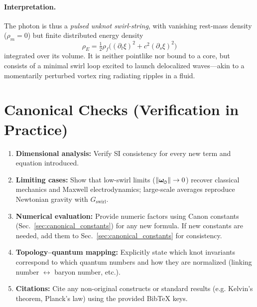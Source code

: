 \documentclass[11pt]{article}
\newcommand{\swirlarrow}{%
     \mathchoice{\mkern-2mu\scriptstyle\boldsymbol{\circlearrowleft}}%
                {\mkern-2mu\scriptstyle\boldsymbol{\circlearrowleft}}%
                {\mkern-2mu\scriptscriptstyle\boldsymbol{\circlearrowleft}}%
                {\mkern-2mu\scriptscriptstyle\boldsymbol{\circlearrowleft}}%
}
\newcommand{\omegas}{\boldsymbol{\omega}_{\swirlarrow}}  %
\newcommand{\rhof}{\rho_{\!f}}                           %
\newcommand{\rhoE}{\rho_{\!E}}                           %
\newcommand{\rhom}{\rho_{\!m}}                           %
\begin{document}
\paragraph{Interpretation.}
    The photon is thus a \emph{pulsed unknot swirl-string}, with vanishing rest-mass density ($\rhom=0$) but finite distributed energy density
    \[
        \rhoE = \tfrac{1}{2}\rhof\!\Big((\partial_t \xi)^2 + c^2 (\partial_s \xi)^2\Big)
    \]
    integrated over its volume. It is neither pointlike nor bound to a core, but consists of a minimal swirl loop excited to launch delocalized waves—akin to a momentarily perturbed vortex ring radiating ripples in a fluid.

\section{Canonical Checks (Verification in Practice)}
\label{sec:canonical_checks}
\begin{enumerate}
\item \textbf{Dimensional analysis:} Verify SI consistency for every new term and equation introduced.
\item \textbf{Limiting cases:} Show that low-swirl limits ($\|\omegas\|\to 0$) recover classical mechanics and Maxwell electrodynamics; large-scale averages reproduce Newtonian gravity with $G_{\text{swirl}}$.
\item \textbf{Numerical evaluation:} Provide numeric factors using Canon constants (Sec.~\ref{sec:canonical_constants}) for any new formula. If new constants are needed, add them to Sec.~\ref{sec:canonical_constants} for consistency.
\item \textbf{Topology–quantum mapping:} Explicitly state which knot invariants correspond to which quantum numbers and how they are normalized (linking number $\leftrightarrow$ baryon number, etc.).
\item \textbf{Citations:} Cite any non-original constructs or standard results (e.g. Kelvin’s theorem, Planck’s law) using the provided BibTeX keys.
\end{enumerate}

\end{document}
